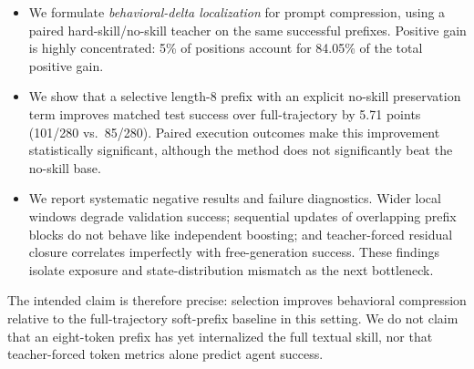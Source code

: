 \begin{itemize}
    \item We formulate \emph{behavioral-delta localization} for prompt compression, using a paired hard-skill/no-skill teacher on the same successful prefixes.  Positive gain is highly concentrated: 5\% of positions account for 84.05\% of the total positive gain.
    \item We show that a selective length-8 prefix with an explicit no-skill preservation term improves matched test success over full-trajectory \softskill by 5.71 points (101/280 vs.\ 85/280).  Paired execution outcomes make this improvement statistically significant, although the method does not significantly beat the no-skill base.
    \item We report systematic negative results and failure diagnostics.  Wider local windows degrade validation success; sequential updates of overlapping prefix blocks do not behave like independent boosting; and teacher-forced residual closure correlates imperfectly with free-generation success.  These findings isolate exposure and state-distribution mismatch as the next bottleneck.
\end{itemize}

The intended claim is therefore precise: selection improves behavioral compression relative to the full-trajectory soft-prefix baseline in this setting.  We do not claim that an eight-token prefix has yet internalized the full textual skill, nor that teacher-forced token metrics alone predict agent success.


